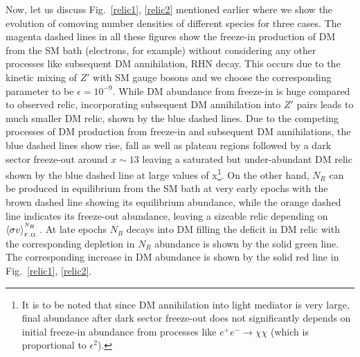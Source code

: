 \documentclass[prd,nofootinbib,preprint,superscriptaddress]{revtex4}
\begin{document}
Now, let us discuss Fig.~\ref{relic1}, \ref{relic2} mentioned earlier where we show the evolution of comoving number densities of different species for three cases. The magenta dashed lines in all these figures show the freeze-in production of DM from the SM bath (electrons, for example) without considering any other processes like subsequent DM annihilation, RHN decay. This occurs due to the kinetic mixing of $Z'$ with SM gauge bosons and we choose the corresponding parameter to be $\epsilon = 10^{-9}$. While DM abundance from freeze-in is huge compared to observed relic, incorporating subsequent DM annihilation into $Z'$ pairs leads to much smaller DM relic, shown by the blue dashed lines. Due to the competing processes of DM production from freeze-in and subsequent DM annihilations, the blue dashed lines show rise, fall as well as plateau regions followed by a dark sector freeze-out around $x \sim 13$ leaving a saturated but under-abundant DM relic shown by the blue dashed line at large values of x\footnote{It is to be noted that since DM annihilation into light mediator is very large, final abundance after dark sector freeze-out does not significantly depends on initial freeze-in abundance from processes like $e^{+}e^{-} \to \chi \chi$ (which is proportional to $\epsilon^2$).}. On the other hand, $N_{R}$ can be produced in equilibrium from the SM bath at very early epochs with the brown dashed line showing its equilibrium abundance, while the orange dashed line indicates its freeze-out abundance, leaving a sizeable relic depending on $\langle\sigma v \rangle^{^{N_R}}_{_{ \rm F.O.}}$. At late epochs $N_R$ decays into DM filling the deficit in DM relic with the corresponding depletion in $N_R$ abundance is shown by the solid green line. The corresponding increase in DM abundance is shown by the solid red line in Fig.~\ref{relic1}, \ref{relic2}.




\end{document}
